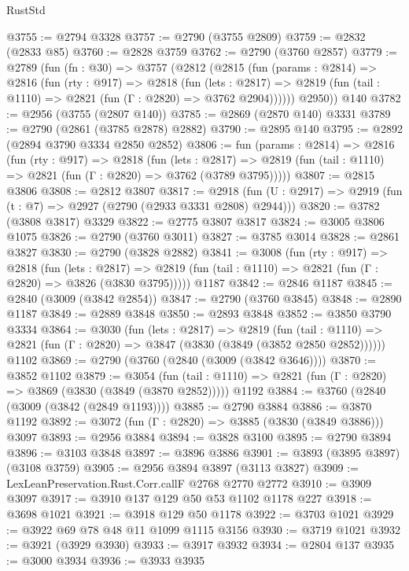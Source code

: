 \begin{lexlean}{RustStd}
\begin{coremodule}
{\begin{coremodule}
{{{{{{{{{{{{{{{{{{{{{{{{{{@3755 := @2794 @3328
@3757 := @2790 (@3755 @2809)
@3759 := @2832 (@2833 @85)
@3760 := @2828 @3759
@3762 := @2790 (@3760 @2857)
@3779 := @2789
    (fun (fn : @30) =>
    @3757
      (@2812
        (@2815
          (fun (params : @2814) =>
          @2816
            (fun (rty : @917) =>
            @2818
              (fun (lets : @2817) =>
              @2819 (fun (tail : @1110) => @2821 (fun (Γ : @2820) => @3762 @2904))))))
        @2950))
    @140
@3782 := @2956 (@3755 (@2807 @140))
@3785 := @2869 (@2870 @140) @3331
@3789 := @2790 (@2861 (@3785 @2878) @2882)
@3790 := @2895 @140
@3795 := @2892 (@2894 @3790 @3334 @2850 @2852)
@3806 := fun (params : @2814) =>
  @2816
    (fun (rty : @917) =>
    @2818
      (fun (lets : @2817) =>
      @2819 (fun (tail : @1110) => @2821 (fun (Γ : @2820) => @3762 (@3789 @3795)))))
@3807 := @2815 @3806
@3808 := @2812 @3807
@3817 := @2918 (fun (U : @2917) => @2919 (fun (t : @7) => @2927 (@2790 (@2933 @3331 @2808) @2944)))
@3820 := @3782 (@3808 @3817) @3329
@3822 := @2775 @3807 @3817
@3824 := @3005 @3806 @1075
@3826 := @2790 (@3760 @3011)
@3827 := @3785 @3014
@3828 := @2861 @3827
@3830 := @2790 (@3828 @2882)
@3841 := @3008
    (fun (rty : @917) =>
    @2818
      (fun (lets : @2817) =>
      @2819 (fun (tail : @1110) => @2821 (fun (Γ : @2820) => @3826 (@3830 @3795)))))
    @1187
@3842 := @2846 @1187
@3845 := @2840 (@3009 (@3842 @2854))
@3847 := @2790 (@3760 @3845)
@3848 := @2890 @1187
@3849 := @2889 @3848
@3850 := @2893 @3848
@3852 := @3850 @3790 @3334
@3864 := @3030
    (fun (lets : @2817) =>
    @2819
      (fun (tail : @1110) => @2821 (fun (Γ : @2820) => @3847 (@3830 (@3849 (@3852 @2850 @2852))))))
    @1102
@3869 := @2790 (@3760 (@2840 (@3009 (@3842 @3646))))
@3870 := @3852 @1102
@3879 := @3054
    (fun (tail : @1110) => @2821 (fun (Γ : @2820) => @3869 (@3830 (@3849 (@3870 @2852)))))
    @1192
@3884 := @3760 (@2840 (@3009 (@3842 (@2849 @1193))))
@3885 := @2790 @3884
@3886 := @3870 @1192
@3892 := @3072 (fun (Γ : @2820) => @3885 (@3830 (@3849 @3886))) @3097
@3893 := @2956 @3884
@3894 := @3828 @3100
@3895 := @2790 @3894
@3896 := @3103 @3848
@3897 := @3896 @3886
@3901 := @3893 (@3895 @3897) (@3108 @3759)
@3905 := @2956 @3894 @3897 (@3113 @3827)
@3909 := LexLeanPreservation.Rust.Corr.callF @2768 @2770 @2772
@3910 := @3909 @3097
@3917 := @3910 @137 @129 @50 @53 @1102 @1178 @227
@3918 := @3698 @1021
@3921 := @3918 @129 @50 @1178
@3922 := @3703 @1021
@3929 := @3922 @69 @78 @48 @11 @1099 @1115 @3156
@3930 := @3719 @1021
@3932 := @3921 (@3929 @3930)
@3933 := @3917 @3932
@3934 := @2804 @137
@3935 := @3000 @3934
@3936 := @3933 @3935
}}}}}}}}}}}}}}}}}}}}}}}}}}
\end{coremodule}}
\end{coremodule}
\end{lexlean}
